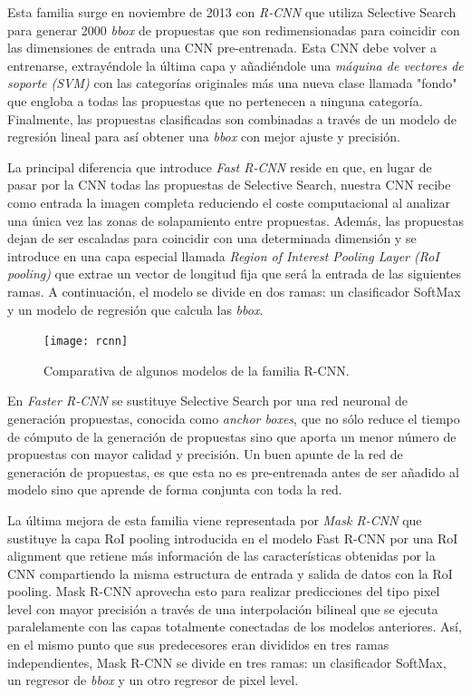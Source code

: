 Esta familia surge en noviembre de 2013 con \emph{R-CNN} \cite{2013arXiv1311.2524G} que utiliza Selective Search \cite{Selective Search for object recognition} para generar 2000 \emph{bbox} de propuestas que son redimensionadas para coincidir con las dimensiones de entrada una CNN pre-entrenada. Esta CNN debe volver a entrenarse, extrayéndole la última capa y añadiéndole una \emph{máquina de vectores de soporte (SVM)} con las categorías originales más una nueva clase llamada "fondo" que engloba a todas las propuestas que no pertenecen a ninguna categoría. Finalmente, las propuestas clasificadas son combinadas a través de un modelo de regresión lineal para así obtener una \emph{bbox} con mejor ajuste y precisión.\newline

La principal diferencia que introduce \emph{Fast R-CNN} \cite{2015arXiv150408083G} reside en que, en lugar de pasar por la CNN todas las propuestas de Selective Search, nuestra CNN recibe como entrada la imagen completa reduciendo el coste computacional al analizar una única vez las zonas de solapamiento entre propuestas. Además, las propuestas dejan de ser escaladas para coincidir con una determinada dimensión y se introduce en una capa especial llamada \emph{Region of Interest Pooling Layer (RoI pooling)} que extrae un vector de longitud fija que será la entrada de las siguientes ramas. A continuación, el modelo se divide en dos ramas: un clasificador SoftMax y un modelo de regresión que calcula las \emph{bbox}. \newline

\begin{figure}[htpb]
  \centering
  \texttt{[image: rcnn]}
  \caption{Comparativa de algunos modelos de la familia R-CNN. \cite{2019arXiv190803673W}}
  \label{fig:r-cnn}
\end{figure}

En \emph{Faster R-CNN} \cite{2015arXiv150601497R} se sustituye Selective Search por una red neuronal de generación propuestas, conocida como \emph{anchor boxes}, que no sólo reduce el tiempo de cómputo de la generación de propuestas sino que aporta un menor número de propuestas con mayor calidad y precisión. Un buen apunte de la red de generación de propuestas, es que esta no es pre-entrenada antes de ser añadido al modelo sino que aprende de forma conjunta con toda la red.\newline

La última mejora de esta familia viene representada por \emph{Mask R-CNN} \cite{2017arXiv170306870H} que sustituye la capa RoI pooling introducida en el modelo Fast R-CNN por una RoI alignment que retiene más información de las características obtenidas por la CNN compartiendo la misma estructura de entrada y salida de datos con la RoI pooling. Mask R-CNN aprovecha esto para realizar predicciones del tipo pixel level con mayor precisión a través de una interpolación bilineal que se ejecuta paralelamente con las capas totalmente conectadas de los modelos anteriores. Así, en el mismo punto que sus predecesores eran divididos en tres ramas independientes, Mask R-CNN se divide en tres ramas: un clasificador SoftMax, un regresor de \emph{bbox} y un otro regresor de pixel level.\newline

